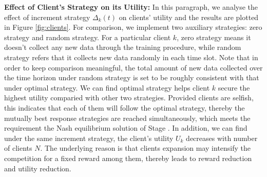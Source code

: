 \documentclass{article}
\theoremstyle{plain}
\theoremstyle{definition}
\theoremstyle{remark}
\begin{document}
\textbf{Effect of Client's Strategy on its Utility: }
In this paragraph, we analyse the effect of increment strategy $\Delta_k(t)$ on clients' utility and the results are plotted in Figure \ref{fig:clients}.
For comparison, we implement two auxiliary strategies: zero strategy and random strategy. For a particular client $k$, zero strategy means it doesn't collect any new data through the training procedure, while random strategy refers that it collects new data randomly in each time slot. Note that in order to keep comparison meaningful, the total amount of new data collected over the time horizon under random strategy is set to be roughly consistent with that under optimal strategy.
We can find optimal strategy helps client $k$ secure the highest utility comparied with other two strategies.
Provided clients are selfish, this indicates that each of them will follow the optimal strategy, thereby the mutually best response strategies are reached simultaneously, which meets the requirement the Nash equilibrium solution of Stage \uppercase\expandafter{}.
In addition, we can find under the same increment strategy, the client's utility $U_k$ decreases with number of clients $N$. The underlying reason is that clients expansion may intensify the competition for a fixed reward among them, thereby leads to reward reduction and utility reduction.
\end{document}
